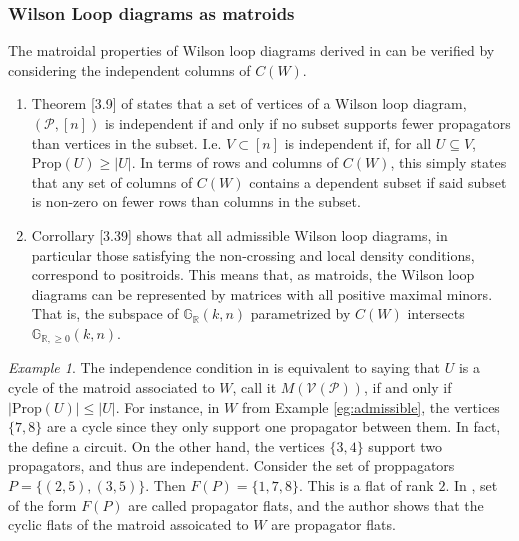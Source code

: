 \documentclass[11pt]{article}
\newcommand{\R}{\mathbb{R}}
\newcommand{\Gr}{\mathbb{G}_{\R, \geq 0}}
\newcommand{\Grall}{\mathbb{G}_{\R}}
\newcommand{\cP}{\mathcal{P}}
\newcommand{\cV}{\mathcal{V}}
\newcommand{\VP}{\cV(\cP)}
\newcommand{\Prop}{\textrm{Prop}}
\theoremstyle{remark}
\newtheorem{eg}[thm]{Example}
\theoremstyle{definition}
\begin{document}
\subsubsection{Wilson Loop diagrams as matroids}
The matroidal properties of Wilson loop diagrams derived in \cite{Wilsonloops}  can be verified by considering the independent columns of $C(W)$.
\begin{enumerate} 
\item Theorem [3.9] of \cite{wilsonloops} states that a set of vertices of a Wilson loop diagram, $(\cP, [n])$  is independent if and only if no subset supports fewer propagators than vertices in the subset. I.e. $V \subset [n]$ is independent if, for all $U \subseteq V$, $\Prop(U) \geq |U|$. In terms of rows and columns of $C(W)$, this simply states that any set of columns of $C(W)$ contains a dependent subset if said subset is non-zero on fewer rows than columns in the subset.
\item Corrollary [3.39] shows that all admissible Wilson loop diagrams, in particular those satisfying the non-crossing and local density conditions, correspond to positroids. This means that, as matroids, the Wilson loop diagrams can be represented by matrices with all positive maximal minors. That is, the subspace of $\Grall(k,n)$ parametrized by $C(W)$ intersects $\Gr(k,n)$.
\end{enumerate}


\begin{eg}\label{eg:wldmatroid}The independence condition in \cite[Theorem 3.9]{wilsonloops} is equivalent to saying that $U$ is a cycle of the matroid associated to $W$, call it $M(\VP)$, if and only if  $|\Prop (U)| \leq |U|$. For instance, in $W$  from Example \ref{eg:admissible}, the vertices $\{7,8\}$ are a cycle since they only support one propagator between them. In fact, the define a circuit. On the other hand, the vertices $\{3,4\}$ support two propagators, and thus are independent. Consider the set of proppagators $P = \{ (2, 5), (3, 5)\}$. Then $F(P) = \{ 1, 7, 8\}$. This is a flat of rank $2$. In \cite{wilsonloops}, set of the form $F(P)$ are called propagator flats, and the author shows that the cyclic flats of the matroid assoicated to $W$ are propagator flats.
 \end{eg}
\end{document}
